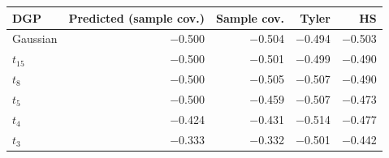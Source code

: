 \begin{tabular}{lrrrr}
\toprule
DGP & Predicted (sample cov.) & Sample cov. & Tyler & HS \\
\midrule
Gaussian & $-$0.500 & $-$0.504 & $-$0.494 & $-$0.503 \\
$t_{15}$ & $-$0.500 & $-$0.501 & $-$0.499 & $-$0.490 \\
$t_8$ & $-$0.500 & $-$0.505 & $-$0.507 & $-$0.490 \\
$t_5$ & $-$0.500 & $-$0.459 & $-$0.507 & $-$0.473 \\
$t_4$ & $-$0.424 & $-$0.431 & $-$0.514 & $-$0.477 \\
$t_3$ & $-$0.333 & $-$0.332 & $-$0.501 & $-$0.442 \\
\bottomrule
\end{tabular}